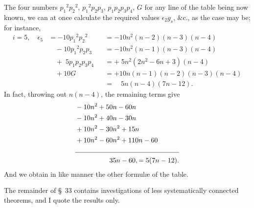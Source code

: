 \documentclass[11pt,a4paper]{book}
\begin{document}
The four numbers ${p_1}^2{p_2}^2$, ${p_1}^2p_2p_3$, $p_1p_2p_3p_4$, $G$ for any line of the table being now known, we can at once calculate the required values $\epsilon_2 g_s$, \&c., as the case may be; for instance,
\begin{align*}
i = 5, \quad \epsilon_5 &= -10{p_1}^2{p_2}^2 &&= -10n^2(n-2)(n-3)(n-4) \\
&\quad - 10{p_1}^2p_2p_3 &&= -10n^2(n-1)(n-3)(n-4) \\
&\quad + \; 5p_1p_2p_3p_4 &&= + \; 5n^2(2n^2 - 6n + 3)(n-4) \\
&\quad + 10G &&= +10n(n-1)(n-2)(n-3)(n-4) \\
&\quad\quad\quad\quad\quad &&= \quad 5n(n-4)(7n - 12).
\end{align*}
In fact, throwing out $n(n-4)$, the remaining terms give
\begin{align*}
&-10n^2 + 50n - 60n \\
&-10n^2 + 40n - 30n \\
&+10n^2 - 30n^2 + 15n \\
&+10n^2 - 60n^2 + 110n - 60 \\
\cline{1-2}
&\quad\quad\quad\quad\quad 35n - 60, = 5(7n - 12).
\end{align*}
And we obtain in like manner the other formul\ae{} of the table.

The remainder of \S\ 33 contains investigations of less systematically connected theorems, and I quote the results only.
\end{document}
